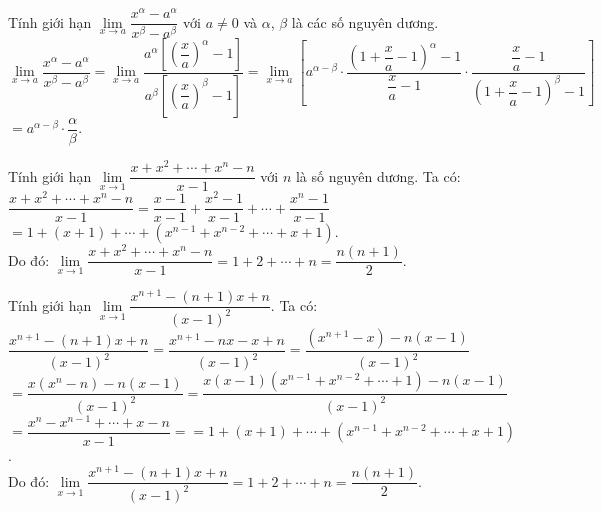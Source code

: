 \begin{bt}%
Tính giới hạn $\lim\limits_{x\to a}\dfrac{x^{\alpha}- a^{\alpha}}{x^{\beta}-a^{\beta}}$ với $a \neq 0$ và $\alpha$, $\beta$ là các số nguyên dương.
\loigiai
{
$\lim\limits_{x\to a}\dfrac{x^{\alpha}-a^{\alpha}}{x^{\beta}-a^{\beta}} = \lim\limits_{x\to a}\dfrac{a^{\alpha}\left[\left(\dfrac{x}{a}\right)^{\alpha}-1\right]}{a^{\beta}\left[\left(\dfrac{x}{a}\right)^{\beta}-1\right]}=\lim\limits_{x\to a}\left[a^{\alpha-\beta} \cdot \dfrac{\left(1+\dfrac{x}{a}-1\right)^{\alpha}-1}{\dfrac{x}{a}-1} \cdot \dfrac{\dfrac{x}{a}-1}{\left(1+\dfrac{x}{a}-1\right)^{\beta}-1}\right]$\\
$=a^{\alpha-\beta} \cdot \dfrac{\alpha}{\beta}$.
}
\end{bt}


\begin{bt}%
Tính giới hạn $\lim\limits_{x \to 1}\dfrac{x + x^2 + \cdots + x^n - n}{x - 1}$ với $n$ là số nguyên dương.
\loigiai
{
Ta có:\\
$\dfrac{x + x^2 + \cdots + x^n - n}{x - 1} = \dfrac{x-1}{x-1} + \dfrac{x^2-1}{x-1} + \cdots + \dfrac{x^n - 1}{x-1}$\\
$= 1 + (x+1) + \cdots + \left(x^{n-1} + x^{n-2} + \cdots + x + 1\right)$.\\
Do đó: $\lim\limits_{x \to 1}\dfrac{x + x^2 + \cdots + x^n - n}{x - 1} = 1 + 2 + \cdots + n = \dfrac{n(n+1)}{2}$.
}
\end{bt}


\begin{bt}%
Tính giới hạn $\lim\limits_{x \to 1}\dfrac{x^{n+1} - (n+1)x + n}{(x-1)^2}$.
\loigiai
{
Ta có:\\
$\dfrac{x^{n+1} - (n+1)x + n}{(x-1)^2} = \dfrac{x^{n+1} - nx - x + n}{(x-1)^2} = \dfrac{\left(x^{n+1} - x\right) - n(x - 1)}{(x-1)^2}$\\
$= \dfrac{x(x^n - n) - n(x - 1)}{(x-1)^2} = \dfrac{x(x-1)(x^{n-1}+x^{n-2}+ \cdots + 1) - n(x-1)}{(x-1)^2}$\\
$= \dfrac{x^n - x^{n-1} + \cdots + x - n}{x-1} = = 1 + (x+1) + \cdots + \left(x^{n-1} + x^{n-2} + \cdots + x + 1\right)$.\\
Do đó: $\lim\limits_{x \to 1}\dfrac{x^{n+1} - (n+1)x + n}{(x-1)^2} = 1 + 2 + \cdots + n = \dfrac{n(n+1)}{2}$.
}
\end{bt}


